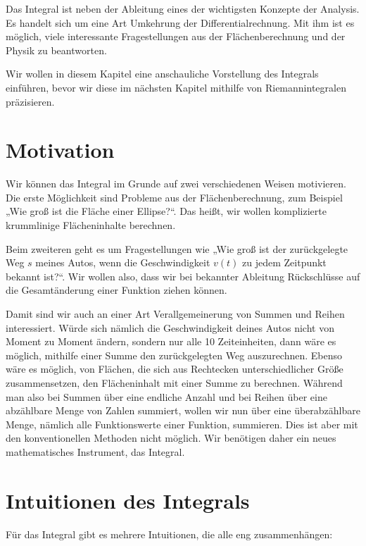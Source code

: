 \documentclass[fontsize=9pt,
               parskip=half-,
               DIV=14,
               listof=chapterentry,
               tocflat]{scrbook}
\begin{document}
Das Integral ist neben der Ableitung eines der wichtigsten Konzepte der Analysis. Es handelt sich um eine Art Umkehrung der Differentialrechnung. Mit ihm ist es möglich, viele interessante Fragestellungen aus der Flächenberechnung und der Physik zu beantworten.

Wir wollen in diesem Kapitel eine anschauliche Vorstellung des Integrals einführen, bevor wir diese im nächsten Kapitel mithilfe von Riemannintegralen präzisieren.

\section{Motivation}

Wir können das Integral im Grunde auf zwei verschiedenen Weisen motivieren. Die erste Möglichkeit sind Probleme aus der Flächenberechnung, zum Beispiel „Wie groß ist die Fläche einer Ellipse?“. Das heißt, wir wollen komplizierte krummlinige Flächeninhalte berechnen.

Beim zweiteren geht es um Fragestellungen wie „Wie groß ist der zurückgelegte Weg $s$ meines Autos, wenn die Geschwindigkeit $v(t)$ zu jedem Zeitpunkt bekannt ist?“. Wir wollen also, dass wir bei bekannter Ableitung Rückschlüsse auf die Gesamtänderung einer Funktion ziehen können.

Damit sind wir auch an einer Art Verallgemeinerung von Summen und Reihen interessiert. Würde sich nämlich die Geschwindigkeit deines Autos nicht von Moment zu Moment ändern, sondern nur alle 10 Zeiteinheiten, dann wäre es möglich, mithilfe einer Summe den zurückgelegten Weg auszurechnen. Ebenso wäre es möglich, von Flächen, die sich aus Rechtecken unterschiedlicher Größe zusammensetzen, den Flächeninhalt mit einer Summe zu berechnen. Während man also bei Summen über eine endliche Anzahl und bei Reihen über eine abzählbare Menge von Zahlen summiert, wollen wir nun über eine überabzählbare Menge, nämlich alle Funktionswerte einer Funktion, summieren. Dies ist aber mit den konventionellen Methoden nicht möglich. Wir benötigen daher ein neues mathematisches Instrument, das Integral.
\clearpage
\section{Intuitionen des Integrals}

Für das Integral gibt es mehrere Intuitionen, die alle eng zusammenhängen:
\end{document}
